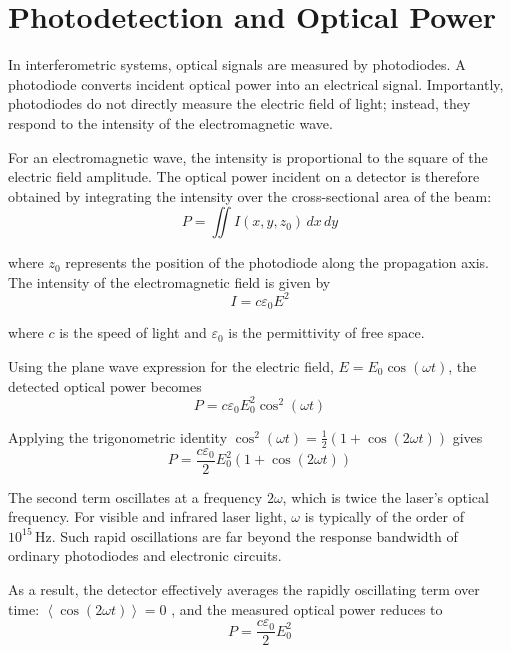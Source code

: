 \documentclass{report}
\begin{document}
\section{Photodetection and Optical Power}

In interferometric systems, optical signals are measured by photodiodes. A photodiode converts incident optical power into an electrical signal. Importantly, photodiodes do not directly measure the electric field of light; instead, they respond to the intensity of the electromagnetic wave.

For an electromagnetic wave, the intensity is proportional to the square of the electric field amplitude. The optical power incident on a detector is therefore obtained by integrating the intensity over the cross-sectional area of the beam:
\begin{equation}
P = \iint I(x,y,z_0)\,dx\,dy
\end{equation}

where $z_0$ represents the position of the photodiode along the propagation axis. The intensity of the electromagnetic field is given by
\begin{equation}
I = c\varepsilon_0 E^2
\end{equation}

where $c$ is the speed of light and $\varepsilon_0$ is the permittivity of free space.

Using the plane wave expression for the electric field,
$E = E_0 \cos(\omega t)$, the detected optical power becomes
\begin{equation}
P = c\varepsilon_0 E_0^2 \cos^2(\omega t)
\end{equation}

Applying the trigonometric identity
$\cos^2(\omega t)=\frac{1}{2}\left(1+\cos(2\omega t)\right)$
gives
\begin{equation}
P = \frac{c\varepsilon_0}{2}E_0^2\left(1+\cos(2\omega t)\right)
\end{equation}

The second term oscillates at a frequency $2\omega$, which is twice the laser's optical frequency. For visible and infrared laser light, $\omega$ is typically of the order of $10^{15}\,\text{Hz}$. Such rapid oscillations are far beyond the response bandwidth of ordinary photodiodes and electronic circuits.

As a result, the detector effectively averages the rapidly oscillating term over time: 
$\left\langle \cos(2\omega t) \right\rangle = 0$
, and the measured optical power reduces to
\begin{equation}
\boxed{P = \frac{c\varepsilon_0}{2}E_0^2}
\end{equation}
\end{document}

